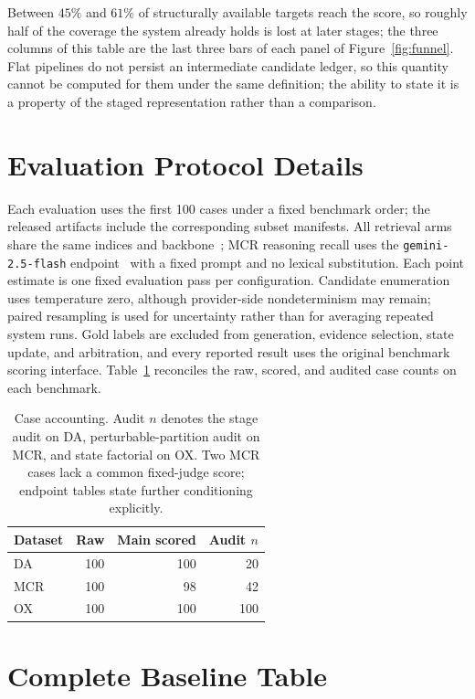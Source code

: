 \documentclass[letterpaper]{article}
\begin{document}
Between $45\%$ and $61\%$ of structurally available targets reach the score, so roughly half of the coverage the system already holds is lost at later stages; the three columns of this table are the last three bars of each panel of Figure~\ref{fig:funnel}.
Flat pipelines do not persist an intermediate candidate ledger, so this quantity cannot be computed for them under the same definition; the ability to state it is a property of the staged representation rather than a comparison.

\section{Evaluation Protocol Details}

Each evaluation uses the first 100 cases under a fixed benchmark order; the released artifacts include the corresponding subset manifests.
All retrieval arms share the same indices and  backbone~\cite{llama33}; MCR reasoning recall uses the \texttt{gemini-2.5-flash} endpoint~\cite{gemini25flash} with a fixed prompt and no lexical substitution.
Each point estimate is one fixed evaluation pass per configuration.
Candidate enumeration uses temperature zero, although provider-side nondeterminism may remain; paired resampling is used for uncertainty rather than for averaging repeated system runs.
Gold labels are excluded from generation, evidence selection, state update, and arbitration, and every reported result uses the original benchmark scoring interface.
Table~\ref{tab:case-accounting} reconciles the raw, scored, and audited case counts on each benchmark.

\begin{table}[tb]
\centering
\small
\begin{tabular}{@{}lrrr@{}}
\toprule
Dataset & Raw & Main scored & Audit $n$ \\
\midrule
DA & 100 & 100 & 20 \\
MCR & 100 & 98 & 42 \\
OX & 100 & 100 & 100 \\
\bottomrule
\end{tabular}
\caption{Case accounting. Audit $n$ denotes the stage audit on DA, perturbable-partition audit on MCR, and state factorial on OX. Two MCR cases lack a common fixed-judge score; endpoint tables state further conditioning explicitly.}
\label{tab:case-accounting}
\end{table}

\section{Complete Baseline Table}
\end{document}
